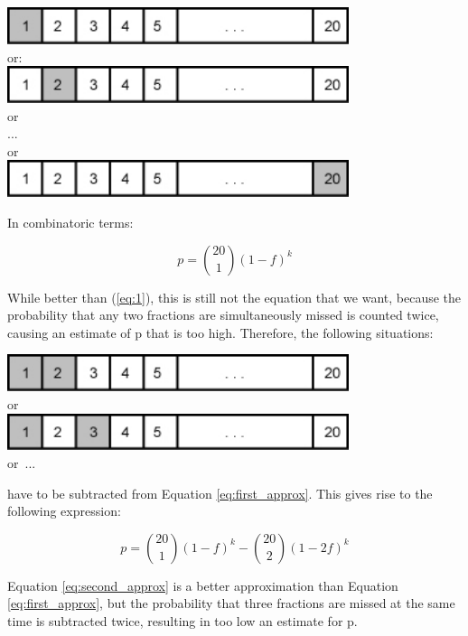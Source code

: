 \documentclass[12]{article}
\begin{document}
\begin{minipage}[c]{\textwidth}

  \begin{center}
  \includegraphics[width=10cm]{A3.jpg}\\
  \mbox{or:}\\
  \includegraphics[width=10cm]{A4.jpg}\\
  \mbox{or}\\
  \mbox{...}\\
  \mbox{or}\\
  \includegraphics[width=10cm]{A5.jpg}  
  \end{center}

In combinatoric terms:

\begin{equation}
  \label{eq:first_approx}
  p  = \binom{20}{1}(1-f)^k
\end{equation}

While better than (\ref{eq:1}), this is still not the equation that we
want,   because   the  probability   that   any   two  fractions   are
simultaneously missed is counted twice,  causing an estimate of p that
is too high.  Therefore, the following situations:
\end{minipage}

\begin{minipage}[c]{\textwidth}

  \begin{center}
  \includegraphics[width=10cm]{A6.jpg}\\
  \mbox{or}\\
  \includegraphics[width=10cm]{A7.jpg}\\
  \mbox{or ...}
  \end{center}

have to be subtracted from Equation \ref{eq:first_approx}. This
gives rise to the following expression:

\begin{equation}
  \label{eq:second_approx}
  p  = \binom{20}{1}(1-f)^k - \binom{20}{2}(1-2f)^k
\end{equation}

Equation  \ref{eq:second_approx}   is  a  better   approximation  than
Equation  \ref{eq:first_approx},   but  the  probability   that  three
fractions are missed  at the same time is  subtracted twice, resulting
in too  low an estimate  for p.
\end{minipage}
\end{document}
